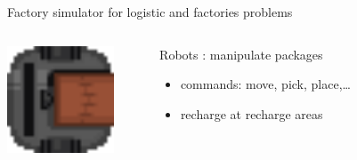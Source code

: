 \begin{frame}{Factory simulator for logistic and factories problems}
    \begin{columns}
        \begin{column}{0.2\textwidth}
            \includegraphics[width = 0.8\textwidth]{images/godot/robot_texture.png}
        \end{column}
        \begin{column}{0.7\textwidth}
            Robots : manipulate packages
            \begin{itemize}
                \item commands: move, pick, place,\dots
                \item recharge at recharge areas
            \end{itemize}
        \end{column}
    \end{columns}
\end{frame}


            

